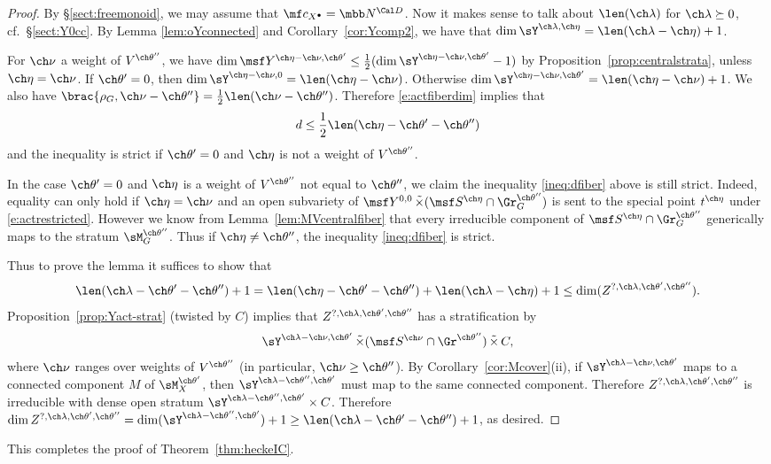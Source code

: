 \documentclass[final]{amsart}
\theoremstyle{remark}
\theoremstyle{definition}
\DeclareMathOperator*{\ttimes}{\tilde\times}
\numberwithin{equation}{section}
\begin{document}
\begin{proof}
By \S\ref{sect:freemonoid}, we may assume that $\mf c_{X^\bullet} = \mbb N^{\Cal D}$. 
Now it makes sense to talk about $\len(\ch\lambda)$ for $\ch\lambda \succeq 0$, cf.~\S\ref{sect:Y0cc}. 
By Lemma \ref{lem:oYconnected} and Corollary~\ref{cor:Ycomp2},
we have that $\dim \sY^{\ch\lambda,\ch\eta} = \len(\ch\lambda-\ch\eta)+1$. 

For $\ch\nu$ a weight of $V^{\ch\theta''}$, we have 
$\dim \msf Y^{\ch\eta-\ch\nu,\ch\theta'} \le \frac 1 2(\dim \sY^{\ch\eta-\ch\nu,\ch\theta'}-1)$
by Proposition~\ref{prop:centralstrata}, unless $\ch\eta=\ch\nu$.  
If $\ch\theta'=0$, then $\dim \sY^{\ch\eta-\ch\nu,0} = \len(\ch\eta-\ch\nu)$. 
Otherwise $\dim \sY^{\ch\eta-\ch\nu,\ch\theta'} = \len(\ch\eta-\ch\nu)+1$. 
We also have $\brac{\rho_G,\ch\nu-\ch\theta''} = \frac 1 2 \len(\ch\nu-\ch\theta'')$. 
Therefore \eqref{e:actfiberdim} implies that 
\begin{equation} \label{ineq:dfiber}
 d \le \frac 1 2 \len(\ch\eta-\ch\theta'-\ch\theta'')
\end{equation}
and the inequality is strict if $\ch\theta' = 0$ and $\ch\eta$ is not a weight of $V^{\ch\theta''}$. 

In the case $\ch\theta'=0$ and $\ch\eta$ is a weight of $V^{\ch\theta''}$ not equal to 
$\ch\theta''$, we claim the inequality \eqref{ineq:dfiber} above is still strict. 
Indeed, equality can only hold if $\ch\eta=\ch\nu$ and an open subvariety of 
$\msf Y^{0,0} \ttimes (\msf S^{\ch\eta}\cap \Gr^{\ch\theta''}_G)$ is sent to 
the special point $t^{\ch\eta}$ under \eqref{e:actrestricted}. 
However we know from Lemma~\ref{lem:MVcentralfiber} that every irreducible
component of $\msf S^{\ch\eta}\cap \Gr^{\ch\theta''}_G$ generically maps to 
the stratum $\sM^{\ch\theta''}_G$. Thus if $\ch\eta \ne \ch\theta''$, 
the inequality \eqref{ineq:dfiber} is strict.


Thus to prove the lemma it suffices to show that 
\[
 \len(\ch\lambda-\ch\theta'-\ch\theta'')+1 = \len(\ch\eta-\ch\theta'-\ch\theta'') + \len(\ch\lambda-\ch\eta) + 1 \le 
\dim (Z^{?,\ch\lambda,\ch\theta',\ch\theta''}).
\]
Proposition~\ref{prop:Yact-strat} (twisted by $C$) implies that 
$Z^{?,\ch\lambda,\ch\theta',\ch\theta''}$ has a stratification by 
\[ \sY^{\ch\lambda-\ch\nu, \ch\theta'} \ttimes (\msf S^{\ch\nu}\cap \Gr^{\ch\theta''}) \ttimes C,\]
where $\ch\nu$ ranges over weights of $V^{\ch\theta''}$ (in particular, $\ch\nu\ge \ch\theta''$). 
By Corollary~\ref{cor:Mcover}(ii), if
$\sY^{\ch\lambda-\ch\nu,\ch\theta'}$ maps to a connected component $M$ of 
$\sM^{\ch\theta'}_X$, then $\sY^{\ch\lambda-\ch\theta'', \ch\theta'}$ must map to the
same connected component. 
Therefore $Z^{?,\ch\lambda,\ch\theta',\ch\theta''}$ is irreducible with 
dense open stratum
$\sY^{\ch\lambda-\ch\theta'',\ch\theta'} \times C$. 
Therefore 
$\dim Z^{?,\ch\lambda,\ch\theta',\ch\theta''} = \dim(\sY^{\ch\lambda-\ch\theta'',\ch\theta'})+1
\ge \len(\ch\lambda-\ch\theta'-\ch\theta'') + 1$, as desired.
\end{proof}

This completes the proof of Theorem~\ref{thm:heckeIC}.







\end{document}
